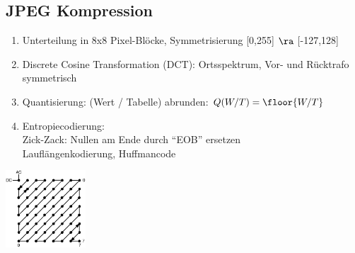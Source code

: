 \documentclass[fs, footer]{latex4ei}
\begin{document}
\begin{multicols*}{4}
	\subsection{JPEG Kompression}
	\begin{enumerate}
		\item Unterteilung in 8x8 Pixel-Blöcke, Symmetrisierung [0,255] $\ra$ [-127,128]
		\item Discrete Cosine Transformation (DCT): Ortsspektrum, Vor- und Rücktrafo symmetrisch
		\item Quantisierung: (Wert / Tabelle) abrunden: $Q(W/T) = \floor{W/T}$
		\item Entropiecodierung: \\
			Zick-Zack: Nullen am Ende durch “EOB” ersetzen\\
			Lauflängenkodierung, Huffmancode
	\end{enumerate}
	\includegraphics[width = 3cm]{./img/zickzack.png}


\end{multicols*}

\end{document}
